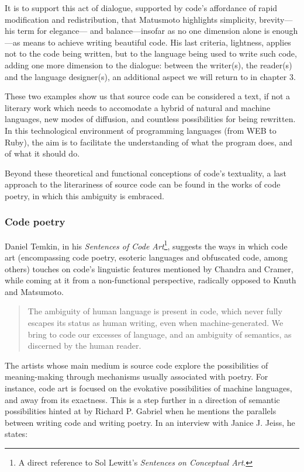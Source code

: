It is to support this act of dialogue, supported by code's affordance of rapid modification and redistribution, that Matusmoto highlights simplicity, brevity—his term for elegance— and balance—insofar as no one dimension alone is enough—as means to achieve writing beautiful code. His last criteria, lightness, applies not to the code being written, but to the language being used to write such code, adding one more dimension to the dialogue: between the writer(s), the reader(s) and the language designer(s), an additional aspect we will return to in chapter 3.

These two examples show us that source code can be considered a text, if not a literary work which needs to accomodate a hybrid of natural and machine languages, new modes of diffusion, and countless possibilities for being rewritten. In this technological environment of programming languages (from WEB to Ruby), the aim is to facilitate the understanding of what the program does, and of what it should do.

Beyond these theoretical and functional conceptions of code's textuality, a last approach to the literariness of source code can be found in the works of code poetry, in which this ambiguity is embraced.

\subsubsection{Code poetry}
\label{subsubsec:code-poetry}

Daniel Temkin, in his \emph{Sentences of Code Art}\footnote{A direct reference to Sol Lewitt's \emph{Sentences on Conceptual Art}.}, suggests the ways in which code art (encompassing code poetry, esoteric languages and obfuscated code, among others) touches on code's linguistic features mentioned by Chandra and Cramer, while coming at it from a non-functional perspective, radically opposed to Knuth and Matsumoto.

\begin{quote}
  The ambiguity of human language is present in code, which never fully escapes its status as human writing, even when machine-generated. We bring to code our excesses of language, and an ambiguity of semantics, as discerned by the human reader. \citep{temkin_sentences_2017}
\end{quote}

The artists whose main medium is source code explore the possibilities of meaning-making through mechanisms usually associated with poetry. For instance, code art is focused on the evokative possibilities of machine languages, and away from its exactness. This is a step further in a direction of semantic possibilities hinted at by Richard P. Gabriel when he mentions the parallels between writing code and writing poetry. In an interview with Janice J. Jeiss, he states:

